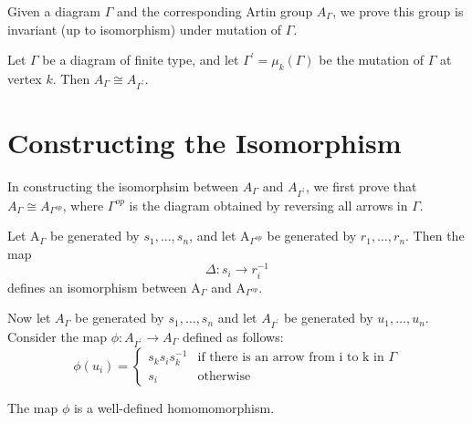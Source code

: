 \documentclass{beamer}
\begin{document}
\begin{frame}
Given a diagram $\Gamma$ and the corresponding Artin group $A_{\Gamma}$, we prove this group is invariant (up to isomorphism) under mutation of $\Gamma$.

\begin{theorem}
Let $\Gamma$ be a diagram of finite type, and let $\Gamma^{\prime} = \mu_k(\Gamma)$ be the mutation of $\Gamma$ at vertex $k$. Then $A_{\Gamma} \cong A_{\Gamma^{\prime}}$.
\end{theorem}
\end{frame}

\section{Constructing the Isomorphism}

\begin{frame}
In constructing the isomorphsim between $A_{\Gamma}$ and $A_{\Gamma^{\prime}}$, we first prove that $A_{\Gamma} \cong A_{\Gamma^{op}}$, where $\Gamma^{op}$ is the diagram obtained by reversing all arrows in $\Gamma$.
\begin{lemma}
Let A$_{\Gamma}$ be generated by $s_{1}, \dots, s_{n}$, and let A$_{\Gamma^{op}}$ be generated by $r_{1}, \dots, r_{n}$. Then the map $$\Delta: s_{i} \rightarrow r_{i}^{-1}$$ defines an isomorphism between A$_{\Gamma}$ and A$_{\Gamma^{op}}.$
\end{lemma}
\end{frame}

\begin{frame}
Now let $A_{\Gamma}$ be generated by $s_{1}, \dots, s_{n}$ and let $A_{\Gamma^{\prime}}$ be generated by $u_{1}, \dots, u_{n}$. Consider the map $\phi: A_{\Gamma^{\prime}} \rightarrow A_{\Gamma}$ defined as follows:
$$\phi(u_{i}) = 
\begin{cases}
s_{k}s_{i}s_{k}^{-1} &\text{if there is an arrow from i to k in $\Gamma$} \\
s_{i} &\text{otherwise}
\end{cases}$$

\begin{lemma}
The map $\phi$ is a well-defined homomomorphism.
\end{lemma}
\end{frame}
\end{document}
